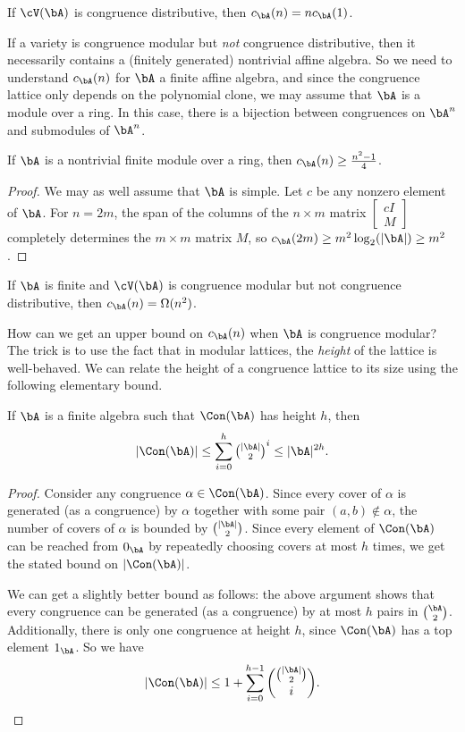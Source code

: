 \begin{cor} If $\cV(\bA)$ is congruence distributive, then $c_\bA(n) = nc_\bA(1)$.
\end{cor}

If a variety is congruence modular but \emph{not} congruence distributive, then it necessarily contains a (finitely generated) nontrivial affine algebra. So we need to understand $c_\bA(n)$ for $\bA$ a finite affine algebra, and since the congruence lattice only depends on the polynomial clone, we may assume that $\bA$ is a module over a ring. In this case, there is a bijection between congruences on $\bA^n$ and submodules of $\bA^n$.

\begin{prop} If $\bA$ is a nontrivial finite module over a ring, then $c_\bA(n) \ge \frac{n^2-1}{4}$.
\end{prop}
\begin{proof} We may as well assume that $\bA$ is simple. Let $c$ be any nonzero element of $\bA$. For $n = 2m$, the span of the columns of the $n\times m$ matrix $\begin{bmatrix} cI\\ M\end{bmatrix}$ completely determines the $m \times m$ matrix $M$, so $c_\bA(2m) \ge m^2\log_2(|\bA|) \ge m^2$.
\end{proof}

\begin{cor} If $\bA$ is finite and $\cV(\bA)$ is congruence modular but not congruence distributive, then $c_{\bA}(n) = \Omega(n^2)$.
\end{cor}

How can we get an upper bound on $c_\bA(n)$ when $\bA$ is congruence modular? The trick is to use the fact that in modular lattices, the \emph{height} of the lattice is well-behaved. We can relate the height of a congruence lattice to its size using the following elementary bound.

\begin{prop} If $\bA$ is a finite algebra such that $\Con(\bA)$ has height $h$, then
\[
|\Con(\bA)| \le \sum_{i = 0}^h \tbinom{|\bA|}{2}^i \le |\bA|^{2h}.
\]
\end{prop}
\begin{proof} Consider any congruence $\alpha \in \Con(\bA)$. Since every cover of $\alpha$ is generated (as a congruence) by $\alpha$ together with some pair $(a,b) \not\in \alpha$, the number of covers of $\alpha$ is bounded by $\binom{|\bA|}{2}$. Since every element of $\Con(\bA)$ can be reached from $0_\bA$ by repeatedly choosing covers at most $h$ times, we get the stated bound on $|\Con(\bA)|$.

We can get a slightly better bound as follows: the above argument shows that every congruence can be generated (as a congruence) by at most $h$ pairs in $\binom{\bA}{2}$. Additionally, there is only one congruence at height $h$, since $\Con(\bA)$ has a top element $1_\bA$. So we have
\[
|\Con(\bA)| \le 1 + \sum_{i = 0}^{h-1} \binom{\binom{|\bA|}{2}}{i}.\qedhere
\]
\end{proof}

